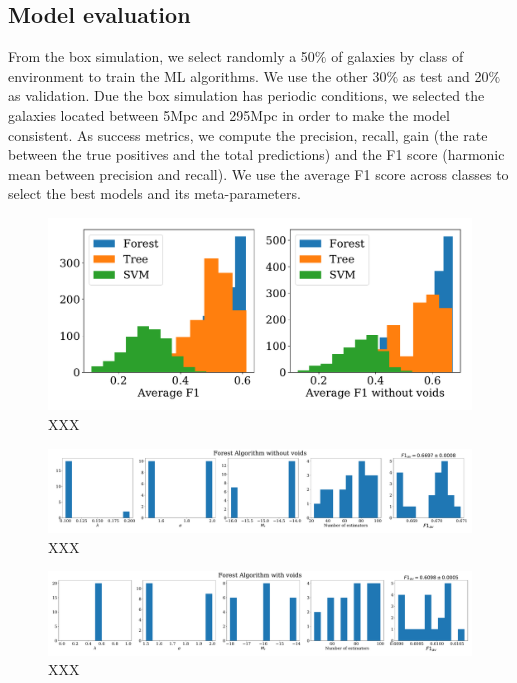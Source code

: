 \documentclass[usenatbib]{mnras}
\begin{document}
\subsection{Model evaluation}

From the box simulation, we select randomly a 50$\%$ of galaxies by class of environment to train the ML algorithms. We use the other 30$\%$ as test and  20$\%$ as validation. Due the box simulation has periodic conditions, we selected the galaxies located between 5Mpc and 295Mpc in order to make the model consistent.  
As success metrics, we compute the precision, recall, gain (the rate between the true positives
and the total predictions) and the F1 score (harmonic mean between precision and recall).
We use the average F1 score across classes to select the best models and its meta-parameters.

\begin{figure}
    \includegraphics[scale=0.45]{Figs/p_hist_f1.pdf}
    \caption{XXX}
    \label{fig:methods}
\end{figure}

\begin{figure}
\centering
    \includegraphics[scale=0.22]{Figs/p_features_Forest_F1_av_no_voids.pdf}
    \caption{XXX}
    \label{fig:feature_void}    
\end{figure}

\begin{figure}
\centering
    \includegraphics[scale=0.22]{Figs/p_features_Forest_F1_av.pdf}
    \caption{XXX}
    \label{fig:features_no_void}    
\end{figure}
\end{document}
